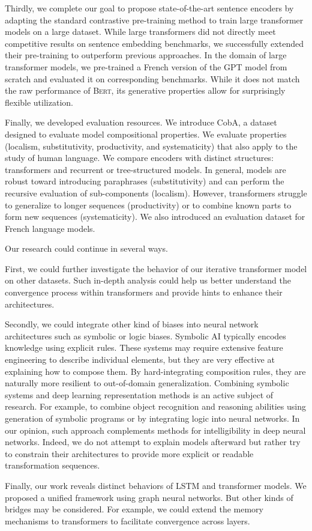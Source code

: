 Thirdly, we complete our goal to propose state-of-the-art sentence encoders by adapting the standard contrastive pre-training method to train large transformer models on a large dataset. While large transformers did not directly meet competitive results on sentence embedding benchmarks, we successfully extended their pre-training to outperform previous approaches. In the domain of large transformer models, we pre-trained a French version of the GPT model from scratch and evaluated it on corresponding benchmarks. While it does not match the raw performance of \textsc{Bert}, its generative properties allow for surprisingly flexible utilization.

Finally, we developed evaluation resources. We introduce CobA, a dataset designed to evaluate model compositional properties. We evaluate properties (localism, substitutivity, productivity, and systematicity) that also apply to the study of human language. We compare encoders with distinct structures: transformers and recurrent or tree-structured models. In general, models are robust toward introducing paraphrases (substitutivity) and can perform the recursive evaluation of sub-components (localism). However, transformers struggle to generalize to longer sequences (productivity) or to combine known parts to form new sequences (systematicity). We also introduced an evaluation dataset for French language models.

Our research could continue in several ways. 

First, we could further investigate the behavior of our iterative transformer model on other datasets. Such in-depth analysis could help us better understand the convergence process within transformers and provide hints to enhance their architectures. 

Secondly, we could integrate other kind of biases into neural network architectures such as symbolic or logic biases. Symbolic AI typically encodes knowledge using explicit rules. These systems may require extensive feature engineering to describe individual elements, but they are very effective at explaining how to compose them. By hard-integrating composition rules, they are naturally more resilient to out-of-domain generalization. Combining symbolic systems and deep learning representation methods is an active subject of research. For example, to combine object recognition and reasoning abilities using generation of symbolic programs or by integrating logic into neural networks. In our opinion, such approach complements methods for intelligibility in deep neural networks. Indeed, we do not attempt to explain models afterward but rather try to constrain their architectures to provide more explicit or readable transformation sequences. 

Finally, our work reveals distinct behaviors of LSTM and transformer models. We proposed a unified framework using graph neural networks. But other kinds of bridges may be considered. For example, we could extend the memory mechanisms to transformers to facilitate convergence across layers.
